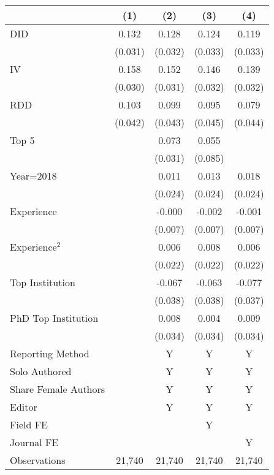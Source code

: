 \begin{tabular}{l*{4}{c}}
\hline\hline
                &\multicolumn{1}{c}{(1)}&\multicolumn{1}{c}{(2)}&\multicolumn{1}{c}{(3)}&\multicolumn{1}{c}{(4)}\\
\hline
DID             &    0.132&    0.128&    0.124&    0.119\\
                &  (0.031)&  (0.032)&  (0.033)&  (0.033)\\
IV              &    0.158&    0.152&    0.146&    0.139\\
                &  (0.030)&  (0.031)&  (0.032)&  (0.032)\\
RDD             &    0.103&    0.099&    0.095&    0.079\\
                &  (0.042)&  (0.043)&  (0.045)&  (0.044)\\
Top 5           &         &    0.073&    0.055&         \\
                &         &  (0.031)&  (0.085)&         \\
Year=2018       &         &    0.011&    0.013&    0.018\\
                &         &  (0.024)&  (0.024)&  (0.024)\\
Experience      &         &   -0.000&   -0.002&   -0.001\\
                &         &  (0.007)&  (0.007)&  (0.007)\\
Experience$^2$  &         &    0.006&    0.008&    0.006\\
                &         &  (0.022)&  (0.022)&  (0.022)\\
Top Institution &         &   -0.067&   -0.063&   -0.077\\
                &         &  (0.038)&  (0.038)&  (0.037)\\
PhD Top Institution&         &    0.008&    0.004&    0.009\\
                &         &  (0.034)&  (0.034)&  (0.034)\\
Reporting Method &         &        Y&        Y&        Y\\
Solo Authored   &         &        Y&        Y&        Y\\
Share Female Authors &         &        Y&        Y&        Y\\
Editor          &         &        Y&        Y&        Y\\
Field FE        &         &         &        Y&         \\
Journal FE      &         &         &         &        Y\\
\hline
Observations    &   21,740&   21,740&   21,740&   21,740\\
\hline\hline
\end{tabular}
